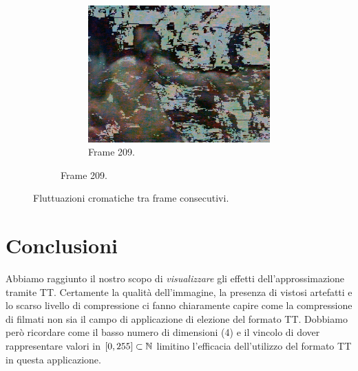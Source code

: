 \documentclass[11pt,a4paper]{article}
\begin{document}
\begin{figure}[h]
\begin{subfigure}[]{\wid\textwidth}
    \begin{subfigure}[]{\wid\textwidth}
      \centering
      \includegraphics[keepaspectratio=true, scale=\scal]{Imgs/MuhammadAli/frame-209}
      \caption{Frame 209.}
    \end{subfigure}
  \end{subfigure}
  \caption{Fluttuazioni cromatiche tra frame consecutivi.}\label{fig:muhammadali_color_flickering}
\end{figure}


\section{Conclusioni}
Abbiamo raggiunto il nostro scopo di \emph{visualizzare} gli effetti dell'approssimazione tramite TT. Certamente la qualità dell'immagine, la presenza di vistosi artefatti e lo scarso livello di compressione ci fanno chiaramente capire come la compressione di filmati non sia il campo di applicazione di elezione del formato TT.
Dobbiamo però ricordare come il basso numero di dimensioni (4) e il vincolo di dover rappresentare valori in $[0,255]\subset\mathbb{N}$ limitino l'efficacia dell'utilizzo del formato TT in questa applicazione.

\end{document}
